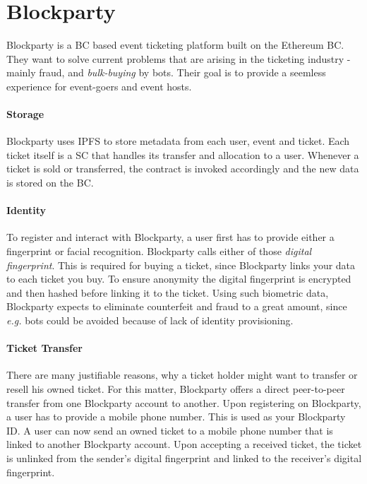 
\section{Blockparty}

Blockparty \cite{blockparty-whitepaper} is a BC based event ticketing platform built on the Ethereum BC. They want to solve current problems that are arising in the ticketing industry - mainly fraud, and \textit{bulk-buying} by bots. Their goal is to provide a seemless experience for event-goers and event hosts.

\paragraph{Storage} Blockparty uses IPFS to store metadata from each user, event and ticket. Each ticket itself is a SC that handles its transfer and allocation to a user. Whenever a ticket is sold or transferred, the contract is invoked accordingly and the new data is stored on the BC.

\paragraph{Identity} To register and interact with Blockparty, a user first has to provide either a fingerprint or facial recognition. Blockparty calls either of those \textit{digital fingerprint}. This is required for buying a ticket, since Blockparty links your data to each ticket you buy. To ensure anonymity the digital fingerprint is encrypted and then hashed before linking it to the ticket. Using such biometric data, Blockparty expects to eliminate counterfeit and fraud to a great amount, since \textit{e.g.} bots could be avoided because of lack of identity provisioning.

\paragraph{Ticket Transfer} There are many justifiable reasons, why a ticket holder might want to transfer or resell his owned ticket. For this matter, Blockparty offers a direct peer-to-peer transfer from one Blockparty account to another. Upon registering on Blockparty, a user has to provide a mobile phone number. This is used as your Blockparty ID. A user can now send an owned ticket to a mobile phone number that is linked to another Blockparty account. Upon accepting a received ticket, the ticket is unlinked from the sender's digital fingerprint and linked to the receiver's digital fingerprint.

